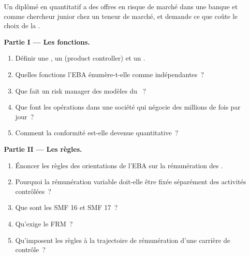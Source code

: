 \begin{problem}\label{pb:in:risk-operations-product-control-and-compliance:1}
Un diplômé en quantitatif a des offres en risque de marché dans une banque et comme chercheur junior chez un teneur de marché, et demande
ce que coûte le choix de la .

\medskip\noindent\textbf{Partie I --- Les fonctions.}
\begin{enumerate}
\item Définir une , un  (product controller) et un .
\item Quelles fonctions l'EBA énumère-t-elle comme  indépendantes~?
\item Que fait un risk manager des modèles du ~?
\item Que font les opérations dans une société qui négocie des millions de fois par jour~?
\item Comment la conformité est-elle devenue quantitative~?
\end{enumerate}

\medskip\noindent\textbf{Partie II --- Les règles.}
\begin{enumerate}[resume]
\item Énoncer les règles des orientations de l'EBA sur la rémunération des .
\item Pourquoi la rémunération variable doit-elle être fixée séparément des activités contrôlées~?
\item Que sont les SMF 16 et SMF 17~?
\item Qu'exige le FRM~?
\item Qu'imposent les règles à la trajectoire de rémunération d'une carrière de contrôle~?
\end{enumerate}


\end{problem}

